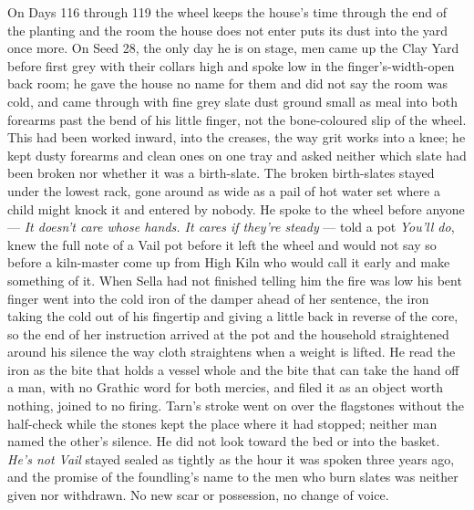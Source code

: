 \documentclass{design/chronicle}
\begin{document}
{On Days 116 through 119 the wheel keeps the house’s time through the end of the planting and the room the house does not enter puts its dust into the yard once more. On Seed 28, the only day he is on stage, men came up the Clay Yard before first grey with their collars high and spoke low in the finger’s-width-open back room; he gave the house no name for them and did not say the room was cold, and came through with fine grey slate dust ground small as meal into both forearms past the bend of his little finger, not the bone-coloured slip of the wheel. This had been worked inward, into the creases, the way grit works into a knee; he kept dusty forearms and clean ones on one tray and asked neither which slate had been broken nor whether it was a birth-slate. The broken birth-slates stayed under the lowest rack, gone around as wide as a pail of hot water set where a child might knock it and entered by nobody. He spoke to the wheel before anyone — \emph{It doesn’t care whose hands. It cares if they’re steady} — told a pot \emph{You’ll do}, knew the full note of a Vail pot before it left the wheel and would not say so before a kiln-master come up from High Kiln who would call it early and make something of it. When Sella had not finished telling him the fire was low his bent finger went into the cold iron of the damper ahead of her sentence, the iron taking the cold out of his fingertip and giving a little back in reverse of the core, so the end of her instruction arrived at the pot and the household straightened around his silence the way cloth straightens when a weight is lifted. He read the iron as the bite that holds a vessel whole and the bite that can take the hand off a man, with no Grathic word for both mercies, and filed it as an object worth nothing, joined to no firing. Tarn’s stroke went on over the flagstones without the half-check while the stones kept the place where it had stopped; neither man named the other’s silence. He did not look toward the bed or into the basket. \emph{He’s not Vail} stayed sealed as tightly as the hour it was spoken three years ago, and the promise of the foundling’s name to the men who burn slates was neither given nor withdrawn. No new scar or possession, no change of voice.

}
\end{document}
